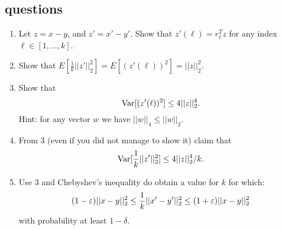 \documentclass{article}
\begin{document}
\subsection*{questions}
\begin{enumerate}
\item Let $z = x-y$, and $z' = x' - y'$. Show that $z'(\ell) =
r_{\ell}^{T}z$ for any index $\ell \in [1,\ldots,k]$.

\item Show that $E[\frac{1}{k}||z'||_{2}^{2}] = E[(z'(\ell))^2] = ||z||_{2}^{2}$.
\item Show that
\[
{\operatorname{Var}}[(z'(\ell))^2] \le 4||z||_{2}^{4}.
\]
Hint: for any vector $w$ we have $||w||_4 \le ||w||_2$.
\item From 3 (even if you did not manage to show it) claim that
\[
{\operatorname{Var}}[\frac{1}{k}||z'||_{2}^{2}] \le 4||z||_{2}^{4}/k.
\]
\item Use 3 and Chebyshev's inequality do obtain a value for $k$
for which:
\[
(1-\varepsilon)||x-y||_{2}^{2} \le \frac{1}{k}||x' -y'||_{2}^{2} \le
(1+\varepsilon)||x-y||_{2}^{2}
\]
with probability at least $1-\delta$.
\end{enumerate}

\pagebreak
\end{document}
